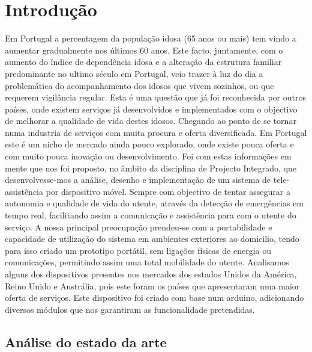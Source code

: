 \chapter{Introdução}
\label{intro}

Em Portugal a percentagem da população idosa (65 anos ou mais) tem vindo a aumentar gradualmente nos últimos 60 anos. Este facto, juntamente, com o aumento do índice de dependência idosa e a alteração da estrutura familiar predominante no ultimo século em Portugal, veio trazer à luz do dia a problemática do acompanhamento dos idosos que vivem sozinhos, ou que requerem vigilância regular.
Esta é uma questão que já foi reconhecida por outros países, onde existem serviços já desenvolvidos e implementados com o objectivo de melhorar a qualidade de vida destes idosos. Chegando ao ponto de se tornar numa industria de serviços com muita procura e oferta diversificada. Em Portugal este é um nicho de mercado ainda pouco explorado, onde existe pouca oferta e com muito pouca inovação ou desenvolvimento.
Foi com estas informações em mente que nos foi proposto, no âmbito da disciplina de Projecto Integrado, que desenvolvesse-mos a análise, desenho e implementação de um sistema de tele-assistência por dispositivo móvel. Sempre com objectivo de tentar assegurar a autonomia e qualidade de vida do utente, através da detecção de emergências em tempo real, facilitando assim a comunicação e assistência para  com o utente do serviço.
A nossa principal preocupação prendeu-se com a portabilidade e capacidade de utilização do sistema em ambientes exteriores ao domicilio, tendo para isso criado um prototipo portátil, sem ligações físicas de energia ou comunicações, permitindo assim uma total mobilidade do utente.
Analisamos alguns dos dispositivos presentes nos mercados dos estados Unidos da América, Reino Unido e Austrália, pois este foram os países que apresentaram uma maior oferta de serviços.
Este dispositivo foi criado com base num arduino, adicionando diversos módulos que nos garantiram as funcionalidade pretendidas.


\section{Análise do estado da arte}


